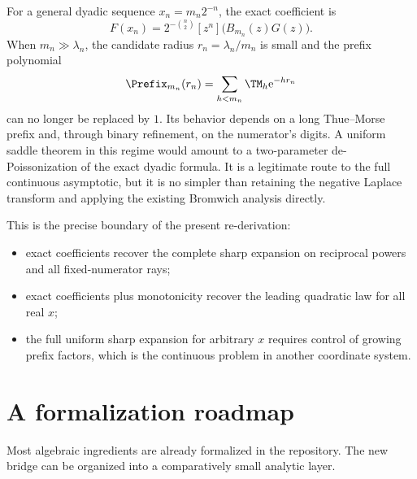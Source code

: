 \documentclass[11pt,oneside]{article}
\theoremstyle{definition}
\theoremstyle{remark}
\newcommand{\e}{\mathrm e}
\begin{document}
For a general dyadic sequence $x_n=m_n2^{-n}$, the exact coefficient is
\begin{equation}
 F(x_n)=2^{-\binom n2}[z^n]\bigl(B_{m_n}(z)G(z)\bigr).
\end{equation}
When $m_n\gg\lambda_n$, the candidate radius $r_n=\lambda_n/m_n$ is small and the prefix polynomial
\begin{equation}
 \Prefix_{m_n}(r_n)=\sum_{h<m_n}\TM_h\e^{-hr_n}
\label{dyadicasymbridge:eq:large-prefix-problem}
\end{equation}
can no longer be replaced by $1$.  Its behavior depends on a long Thue--Morse prefix and, through binary refinement, on the numerator's digits.  A uniform saddle theorem in this regime would amount to a two-parameter de-Poissonization of the exact dyadic formula.  It is a legitimate route to the full continuous asymptotic, but it is no simpler than retaining the negative Laplace transform and applying the existing Bromwich analysis directly.

This is the precise boundary of the present re-derivation:
\begin{itemize}
\item exact coefficients recover the complete sharp expansion on reciprocal powers and all fixed-numerator rays;
\item exact coefficients plus monotonicity recover the leading quadratic law for all real $x$;
\item the full uniform sharp expansion for arbitrary $x$ requires control of growing prefix factors, which is the continuous problem in another coordinate system.
\end{itemize}

\section{A formalization roadmap}
\label{dyadicasymbridge:sec:formalization}

Most algebraic ingredients are already formalized in the repository.  The new bridge can be organized into a comparatively small analytic layer.
\end{document}
